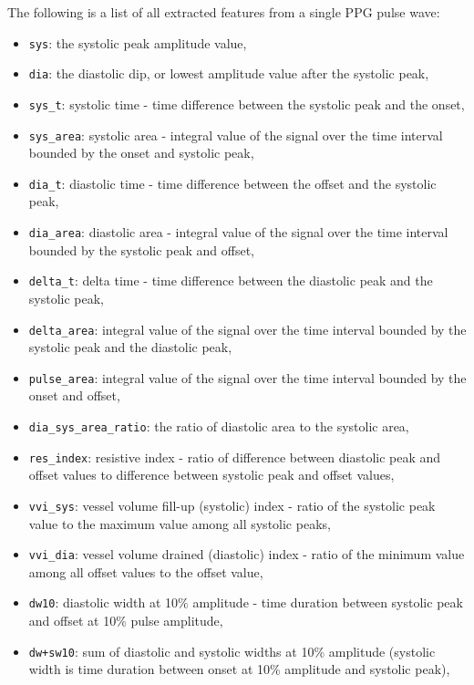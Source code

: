 The following is a list of all extracted features from a single PPG pulse wave:
\begin{itemize}
    \setlength{\itemsep}{-0.1\parsep}
    \item \texttt{sys}: the systolic peak amplitude value,
    \item \texttt{dia}: the diastolic dip, or lowest amplitude value after the systolic peak,
    \item \texttt{sys\_t}: systolic time - time difference between the systolic peak and the onset,
    \item \texttt{sys\_area}: systolic area - integral value of the signal over the time interval bounded by the onset and systolic peak,
    \item \texttt{dia\_t}: diastolic time - time difference between the offset and the systolic peak,
    \item \texttt{dia\_area}: diastolic area - integral value of the signal over the time interval bounded by the systolic peak and offset,
    \item \texttt{delta\_t}: delta time - time difference between the diastolic peak and the systolic peak,
    \item \texttt{delta\_area}: integral value of the signal over the time interval bounded by the systolic peak and the diastolic peak,
    \item \texttt{pulse\_area}: integral value of the signal over the time interval bounded by the onset and offset,
    \item \texttt{dia\_sys\_area\_ratio}: the ratio of diastolic area to the systolic area,
    \item \texttt{res\_index}: resistive index - ratio of difference between diastolic peak and offset values to difference between systolic peak and offset values,
    \item \texttt{vvi\_sys}: vessel volume fill-up (systolic) index - ratio of the systolic peak value to the maximum value among all systolic peaks,
    \item \texttt{vvi\_dia}: vessel volume drained (diastolic) index - ratio of the minimum value among all offset values to the offset value,
    \item \texttt{dw10}: diastolic width at 10\% amplitude - time duration between systolic peak and offset at 10\% pulse amplitude,
    \item \texttt{dw+sw10}: sum of diastolic and systolic widths at 10\% amplitude (systolic width is time duration between onset at 10\% amplitude and systolic peak),

\end{itemize}
